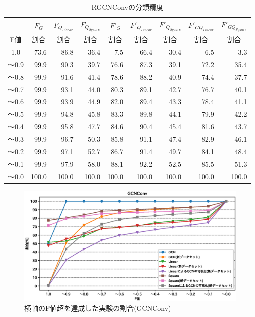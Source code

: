 \begin{table}[tb]
\caption{RGCNConvの分類精度}\label{tbl:result_rgcnconv}
\centering
\begin{tabular}{|c|r|r|r|r|r|r|r|r|}\hline
  & \multicolumn{1}{|c|}{$F_{G}$} & \multicolumn{1}{|c|}{$F_{Q_{Linear}}$} & \multicolumn{1}{|c|}{$F_{Q_{Square}}$} & \multicolumn{1}{|c|}{$F'_{G}$} & \multicolumn{1}{|c|}{${F'}_{Q_{Linear}}$} & \multicolumn{1}{|c|}{${F'}_{Q_{Square}}$} & \multicolumn{1}{|c|}{${F'}_{GQ_{Linear}}$} & \multicolumn{1}{|c|}{${F'}_{GQ_{Square}}$}\\
  \hline
  \multicolumn{1}{|c|}{F値} & \multicolumn{1}{|c|}{割合} & \multicolumn{1}{|c|}{割合} & \multicolumn{1}{|c|}{割合} & \multicolumn{1}{|c|}{割合} & \multicolumn{1}{|c|}{割合} & \multicolumn{1}{|c|}{割合} & \multicolumn{1}{|c|}{割合} & \multicolumn{1}{|c|}{割合} \\
  \hline
  1.0   & 73.6 & 86.8 & 36.4 & 7.5 & 66.4 & 30.4 & 6.5 & 3.3 \\
  〜0.9 & 99.9 & 90.3 & 39.7 & 76.6 & 87.3 & 39.1 & 72.2 & 35.4 \\
  〜0.8 & 99.9 & 91.6 & 41.4 & 78.6 & 88.2 & 40.9 & 74.4 & 37.7 \\
  〜0.7 & 99.9 & 93.1 & 44.0 & 80.3 & 89.1 & 42.7 & 76.7 & 40.1 \\
  〜0.6 & 99.9 & 93.9 & 44.9 & 82.0 & 89.4 & 43.3 & 78.4 & 41.1 \\
  〜0.5 & 99.9 & 94.8 & 45.8 & 83.3 & 89.8 & 44.1 & 79.9 & 42.2 \\
  〜0.4 & 99.9 & 95.8 & 47.7 & 84.6 & 90.4 & 45.4 & 81.6 & 43.7 \\
  〜0.3 & 99.9 & 96.7 & 50.3 & 85.8 & 91.1 & 47.4 & 82.9 & 46.1 \\
  〜0.2 & 99.9 & 97.1 & 52.7 & 86.7 & 91.4 & 49.7 & 84.1 & 48.4 \\
  〜0.1 & 99.9 & 97.9 & 58.0 & 88.1 & 92.2 & 52.5 & 85.5 & 51.3 \\
  〜0.0 & 100.0 & 100.0 & 100.0 & 100.0 & 100.0 & 100.0 & 100.0 & 100.0 \\
  \hline
\end{tabular}
\end{table}

\begin{figure}[tb]
  \centering
  \includegraphics[scale=0.7]{fig/fig-exp_GCNConv.eps}
  \caption{横軸のF値超を達成した実験の割合(GCNConv)}\label{fig:result_gcnconv}
\end{figure}

